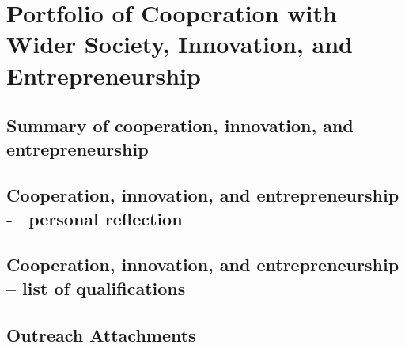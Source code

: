 \chapter{Portfolio of Cooperation with Wider Society, Innovation, and Entrepreneurship}

\section{Summary of cooperation, innovation, and entrepreneurship} \label{sec:summary-of-cooperation-innovation-and-entrepreneurship}

\section{Cooperation, innovation, and entrepreneurship -– personal reflection} \label{sec:cooperation-innovation-and-entrepreneurship-personal-reflection}

\section{Cooperation, innovation, and entrepreneurship – list of qualifications} \label{sec:cooperation-innovation-and-entrepreneurship-list-of-qualifications}

\section{Outreach Attachments} \label{sec:outreach-attachments}
